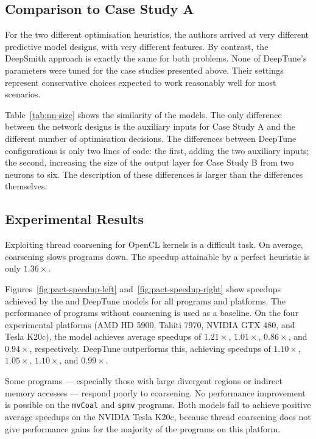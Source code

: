 \subsection{Comparison to Case Study A}

For the two different optimisation heuristics, the authors arrived at very different predictive model designs, with very different features. By contrast, the DeepSmith approach is exactly the same for both problems. None of DeepTune's parameters were tuned for the case studies presented above. Their settings represent conservative choices expected to work reasonably well for most scenarios.

Table~\ref{tab:nn-size} shows the similarity of the models. The only difference between the network designs is the auxiliary inputs for Case Study A and the different number of optimisation decisions. The differences between DeepTune configurations is only two lines of code: the first, adding the two auxiliary inputs; the second, increasing the size of the output layer for Case Study B from two neurons to six. The description of these differences is larger than the differences themselves.




\subsection{Experimental Results}

Exploiting thread coarsening for OpenCL kernels is a difficult task. On average, coarsening slows programs down. The speedup attainable by a perfect heuristic is only $1.36\times$.

Figures~\ref{fig:pact-speedup-left} and~\ref{fig:pact-speedup-right} show speedups achieved by the \citeauthor{Magni2014} and DeepTune models for all programs and platforms. The performance of programs without coarsening is used as a baseline. On the four experimental platforms (AMD HD 5900, Tahiti 7970, NVIDIA GTX 480, and Tesla K20c), the \citeauthor{Magni2014} model achieves average speedups of $1.21\times$, $1.01\times$, $0.86\times$, and $0.94\times$, respectively. DeepTune outperforms this, achieving speedups of $1.10\times$, $1.05\times$, $1.10\times$, and $0.99\times$.

Some programs --- especially those with large divergent regions or indirect memory accesses --- respond poorly to coarsening. No performance improvement is possible on the \texttt{mvCoal} and \texttt{spmv} programs. Both models fail to achieve positive average speedups on the NVIDIA Tesla K20c, because thread coarsening does not give performance gains for the majority of the programs on this platform.

